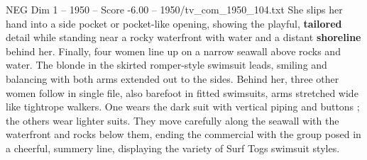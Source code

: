 \begin{textsample}{NEG Dim 1 – 1950 – Score -6.00 – 1950/tv\_com\_1950\_104.txt}
She slips her hand into a side pocket or pocket-like opening, showing the playful, \textbf{tailored} detail while standing near a rocky waterfront with water and a distant \textbf{shoreline} behind her.
Finally, four women line up on a narrow seawall above rocks and water.
The blonde in the skirted romper-style swimsuit leads, smiling and balancing with both arms extended out to the sides.
Behind her, three other women follow in single file, also barefoot in fitted swimsuits, arms stretched wide like tightrope walkers.
One wears the dark suit with vertical piping and buttons ; the others wear lighter suits.
They move carefully along the seawall with the waterfront and rocks below them, ending the commercial with the group posed in a cheerful, summery line, displaying the variety of Surf Togs swimsuit styles.

\end{textsample}
